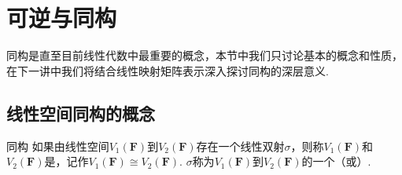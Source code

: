 \section{可逆与同构}

同构是直至目前线性代数中最重要的概念，本节中我们只讨论基本的概念和性质，在下一讲中我们将结合线性映射矩阵表示深入探讨同构的深层意义.

\subsection{线性空间同构的概念}

\begin{definition}{同构}{} 
    如果由线性空间$V_1(\mathbf{F})$到$V_2(\mathbf{F})$存在一个线性双射$\sigma$，则称$V_1(\mathbf{F})$和$V_2(\mathbf{F})$是，记作$V_1(\mathbf{F}) \cong V_2(\mathbf{F})$. $\sigma$称为$V_1(\mathbf{F})$到$V_2(\mathbf{F})$的一个（或）.
\end{definition}

